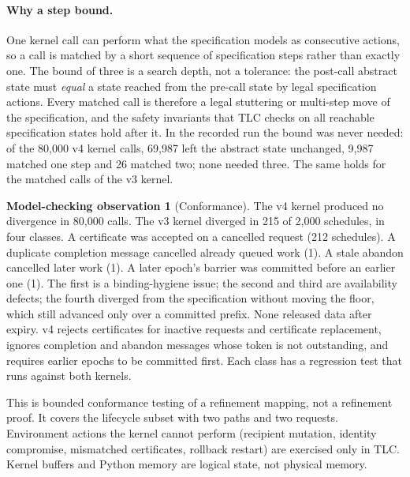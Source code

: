 \documentclass[pdflatex,sn-mathphys-num,twocolumn]{sn-jnl}
\theoremstyle{plain}
\theoremstyle{definition}
\newtheorem{observation}{Model-checking observation}
\begin{document}
\paragraph{Why a step bound.}
One kernel call can perform what the specification models as consecutive actions, so a call is matched by a short sequence of specification steps rather than exactly one. The bound of three is a search depth, not a tolerance: the post-call abstract state must \emph{equal} a state reached from the pre-call state by legal specification actions. Every matched call is therefore a legal stuttering or multi-step move of the specification, and the safety invariants that TLC checks on all reachable specification states hold after it. In the recorded run the bound was never needed: of the 80,000 v4 kernel calls, 69,987 left the abstract state unchanged, 9,987 matched one step and 26 matched two; none needed three. The same holds for the matched calls of the v3 kernel.

\begin{observation}[Conformance]\label{obs:conformance}
The v4 kernel produced no divergence in 80,000 calls. The v3 kernel diverged in 215 of 2,000 schedules, in four classes. A certificate was accepted on a cancelled request (212 schedules). A duplicate completion message cancelled already queued work (1). A stale abandon cancelled later work (1). A later epoch's barrier was committed before an earlier one (1). The first is a binding-hygiene issue; the second and third are availability defects; the fourth diverged from the specification without moving the floor, which still advanced only over a committed prefix. None released data after expiry. v4 rejects certificates for inactive requests and certificate replacement, ignores completion and abandon messages whose token is not outstanding, and requires earlier epochs to be committed first. Each class has a regression test that runs against both kernels.
\end{observation}

This is bounded conformance testing of a refinement mapping, not a refinement proof. It covers the lifecycle subset with two paths and two requests. Environment actions the kernel cannot perform (recipient mutation, identity compromise, mismatched certificates, rollback restart) are exercised only in TLC. Kernel buffers and Python memory are logical state, not physical memory.
\end{document}
